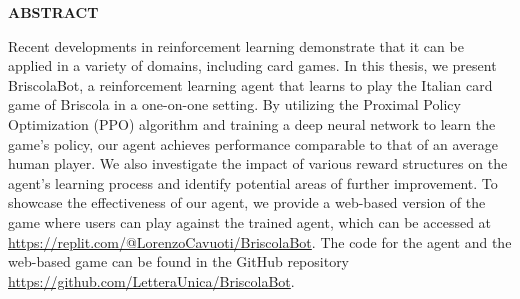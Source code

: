 \begin{center}
    \bf ABSTRACT
\end{center}
Recent developments in reinforcement learning demonstrate that it can be applied in a variety of domains, including card games. In this thesis, we present BriscolaBot, a reinforcement learning agent that learns to play the Italian card game of Briscola in a one-on-one setting. By utilizing the Proximal Policy Optimization (PPO) algorithm and training a deep neural network to learn the game's policy, our agent achieves performance comparable to that of an average human player. We also investigate the impact of various reward structures on the agent's learning process and identify potential areas of further improvement. To showcase the effectiveness of our agent, we provide a web-based version of the game where users can play against the trained agent, which can be accessed at \url{https://replit.com/@LorenzoCavuoti/BriscolaBot}. The code for the agent and the web-based game can be found in the GitHub repository \url{https://github.com/LetteraUnica/BriscolaBot}.